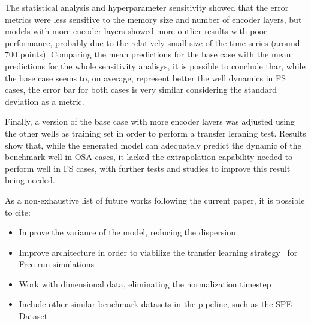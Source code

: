 \documentclass[conference]{IEEEtran}
\begin{document}
The statistical analysis and hyperparameter sensitivity showed that the error metrics were less
sensitive to the memory size and number of encoder layers, but models with more encoder
layers showed more outlier results with poor performance, probably due to the relatively small size of the
time series (around 700 points). Comparing the mean predictions for the base case with the mean
predictions for the whole sensitivity analisys, it is possible to conclude thar, while the
base case seems to, on average, represent better the well dynamics in FS cases, the error bar for both
cases is very similar considering the standard deviation as a metric.

Finally, a version of the base case with more encoder layers was adjusted using the other wells
as training set in order to perform a transfer leraning test. Results show that, while the generated model
can adequately predict the dynamic of the benchmark well in OSA cases, it lacked the extrapolation
capability needed to perform well in FS cases, with further tests and studies to improve this result
being needed.

As a non-exhaustive list of future works following the current paper, it is possible to cite:

\begin{itemize}
    \item Improve the variance of the model, reducing the dispersion
    \item Improve architecture in order to viabilize the transfer learning strategy \
     for Free-run simulations
    \item Work with dimensional data, eliminating the normalization timestep
    \item Include other similar benchmark datasets in the pipeline, such as the SPE Dataset
\end{itemize}




\end{document}
